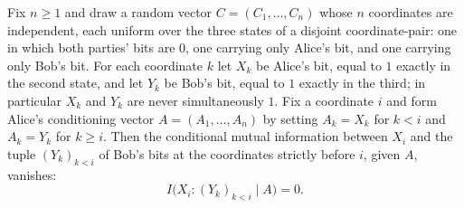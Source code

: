 \begin{theorem}
\label{CommunicationComplexity.Functions.Disjointness.RandomizedLowerBound.uniformDisjointCoordinateVector_crossInfo_condBits_eq_zero}
\leanok
{}
Fix $n \ge 1$ and draw a random vector $C = (C_1, \dots, C_n)$ whose $n$ coordinates are
independent, each uniform over the three states of a disjoint coordinate-pair: one in
which both parties' bits are $0$, one carrying only Alice's bit, and one carrying only
Bob's bit. For each coordinate $k$ let $X_k$ be Alice's bit, equal to $1$ exactly in the
second state, and let $Y_k$ be Bob's bit, equal to $1$ exactly in the third; in
particular $X_k$ and $Y_k$ are never simultaneously $1$. Fix a coordinate $i$ and form
Alice's conditioning vector $A = (A_1, \dots, A_n)$ by setting $A_k = X_k$ for $k < i$
and $A_k = Y_k$ for $k \ge i$. Then the conditional mutual information between $X_i$ and
the tuple $(Y_k)_{k < i}$ of Bob's bits at the coordinates strictly before $i$, given
$A$, vanishes:
\[ I\big(X_i : (Y_k)_{k<i} \;\big|\; A\big) = 0. \]
\end{theorem}

